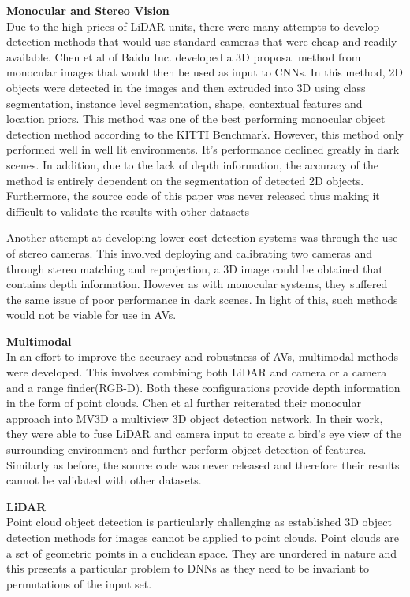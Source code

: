 \textbf{Monocular and Stereo Vision} \\ 
Due to the high prices of LiDAR units, there were many attempts to develop detection methods that would use standard cameras that were cheap and readily available.
Chen et al \cite{chen2016monocular} of Baidu Inc. developed a 3D proposal method from monocular images that would then be used as input to CNNs. In this method, 2D objects were detected in the images and then extruded into 3D using  class segmentation, instance level segmentation, shape,
contextual features and location priors. This method was one of the best performing monocular object detection  method according to the KITTI Benchmark. However, this method only performed well in well lit environments. It's performance declined greatly in dark scenes. In addition, due to the lack of depth information, the accuracy of the method is entirely dependent on the segmentation of detected 2D objects. Furthermore, the source code of this paper was never released thus making it difficult to validate the results with other datasets

Another attempt at developing lower cost detection systems was through the use of stereo cameras. This involved deploying and calibrating two cameras and through stereo matching and reprojection, a 3D image could be obtained that contains depth information. However as with monocular systems, they suffered the same issue of poor performance in dark scenes. In light of this, such methods would not be viable for use in AVs. 



\textbf{Multimodal } \\
In an effort to improve the accuracy and robustness of AVs, multimodal methods were developed. This involves combining both LiDAR and camera or a camera and a range finder(RGB-D). Both these configurations provide depth information in the form of point clouds. 
Chen et al further reiterated their monocular approach into MV3D\cite{chen2017multi} a multiview 3D object detection network. In their work, they were able to fuse LiDAR and camera input to create a bird's eye view of the surrounding environment and further perform object detection of features. Similarly as before, the source code was never released and therefore their results cannot be validated with other datasets. 


\textbf{LiDAR} \\ 
Point cloud object detection is particularly challenging as established 3D object detection methods for images cannot be applied to point clouds. Point clouds are a set of geometric points in a euclidean space. They are unordered in nature and this presents a particular problem to DNNs as they need to be invariant to permutations of the input set.

